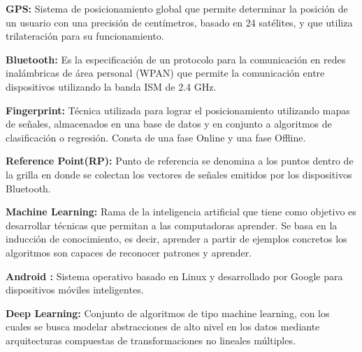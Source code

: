
\textbf{GPS:} Sistema de posicionamiento global que permite determinar la posición de un usuario con una precisión de centímetros, basado en 24 satélites, y que utiliza trilateración para su funcionamiento.

\textbf{Bluetooth:} Es la especificación de un protocolo para la comunicación en redes inalámbricas de área personal (WPAN) que permite la comunicación entre dispositivos utilizando la banda ISM de 2.4 GHz.

\textbf{Fingerprint: } Técnica utilizada para lograr el posicionamiento utilizando mapas de señales, almacenados en una base de datos y en conjunto a algoritmos de clasificación o regresión. Consta de una fase Online y una fase Offline.

\textbf{Reference Point(RP):} Punto de referencia se denomina a los puntos dentro de la grilla en donde se colectan los vectores de señales emitidos por los dispositivos Bluetooth.

\textbf{Machine Learning: } Rama de la inteligencia artificial que tiene como objetivo es desarrollar técnicas que permitan a las computadoras aprender. Se basa en la inducción de conocimiento, es decir, aprender a partir de ejemplos concretos los algoritmos son capaces de reconocer patrones y aprender.


\textbf{Android :} Sistema operativo basado en Linux y desarrollado por Google para dispositivos móviles inteligentes.

\textbf{Deep Learning: } Conjunto de algoritmos de tipo machine learning, con los cuales se busca modelar abstracciones de alto nivel en los datos mediante arquitecturas compuestas de transformaciones no lineales múltiples.
